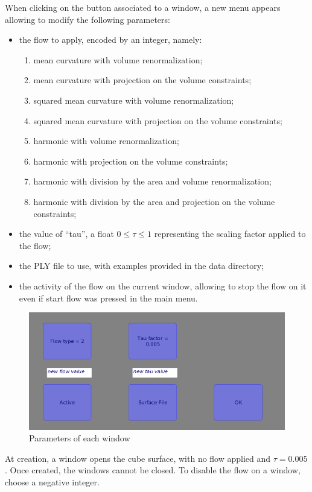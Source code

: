 \documentclass{article}
\begin{document}
When clicking on the button associated to a window, a new menu appears
allowing to modify the following parameters:
\begin{itemize}
  \item the flow to apply, encoded by an integer, namely:
  \begin{enumerate}
    \item mean curvature with volume renormalization;
    \item mean curvature with projection on the volume constraints;
    \item squared mean curvature with volume renormalization;
    \item squared mean curvature with projection on the volume constraints;
    \item harmonic with volume renormalization;
    \item harmonic with projection on the volume constraints;
    \item harmonic with division by the area and volume renormalization;
    \item harmonic with division by the area and projection on the volume constraints;
  \end{enumerate}
  \item the value of ``tau'', a float $0 \leq \tau \leq 1$ representing the scaling factor applied to the flow;
  \item the PLY file to use, with examples provided in the data directory;
  \item the activity of the flow on the current window,
    allowing to stop the flow on it even if start flow was pressed in the main menu.
\end{itemize}

\begin{figure}[h]
  \begin{center}
    \includegraphics[width=.5\textwidth]{img/win_params.png}
    \caption{Parameters of each window}
    \label{fig:win_params}
  \end{center}
\end{figure}

At creation, a window opens the cube surface, with no flow applied and $\tau = 0.005$.
Once created, the windows cannot be closed. To disable the flow on a window,
choose a negative integer.
\end{document}

